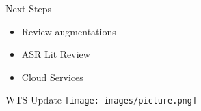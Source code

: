 \begin{frame}{Next Steps}
    \centering
    \begin{itemize}
        \item Review augmentations
        \item ASR Lit Review
        \item Cloud Services
    \end{itemize}
\end{frame}

\begin{frame}{WTS Update}
    \centering
    \texttt{[image: images/picture.png]}
\end{frame}






